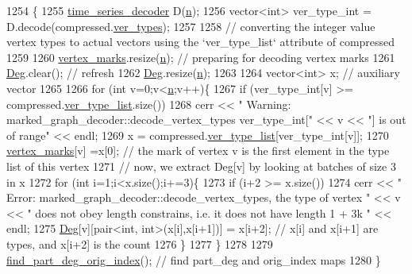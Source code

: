 \begin{DoxyCode}
1254 \{
1255   \hyperlink{classtime__series__decoder}{time\_series\_decoder} D(\hyperlink{classmarked__graph__decoder_aefc93611bc4a3e9a5d3956d97649a0e9}{n});
1256   vector<int> ver\_type\_int = D.decode(compressed.\hyperlink{classmarked__graph__compressed_af446cc5e23c241a92b76642fd5ebc403}{ver\_types});
1257 
1258   \textcolor{comment}{// converting the integer value vertex types to actual vectors using the `ver\_type\_list` attribute of
       compressed}
1259 
1260   \hyperlink{classmarked__graph__decoder_a98be932a5abff7efbc8dd4290268b69a}{vertex\_marks}.resize(\hyperlink{classmarked__graph__decoder_aefc93611bc4a3e9a5d3956d97649a0e9}{n}); \textcolor{comment}{// preparing for decoding vertex marks}
1261   \hyperlink{classmarked__graph__decoder_a5040ad86467693eab415f615408bfb9e}{Deg}.clear(); \textcolor{comment}{// refresh}
1262   \hyperlink{classmarked__graph__decoder_a5040ad86467693eab415f615408bfb9e}{Deg}.resize(\hyperlink{classmarked__graph__decoder_aefc93611bc4a3e9a5d3956d97649a0e9}{n});
1263 
1264   vector<int> x; \textcolor{comment}{// auxiliary vector}
1265 
1266   \textcolor{keywordflow}{for} (\textcolor{keywordtype}{int} v=0;v<\hyperlink{classmarked__graph__decoder_aefc93611bc4a3e9a5d3956d97649a0e9}{n};v++)\{
1267     \textcolor{keywordflow}{if} (ver\_type\_int[v] >= compressed.\hyperlink{classmarked__graph__compressed_af2e3e55223d436628a02758dfae88493}{ver\_type\_list}.size())
1268       cerr << \textcolor{stringliteral}{" Warning: marked\_graph\_decoder::decode\_vertex\_types ver\_type\_int["} << v << \textcolor{stringliteral}{"] is out of
       range"} << endl;
1269     x = compressed.\hyperlink{classmarked__graph__compressed_af2e3e55223d436628a02758dfae88493}{ver\_type\_list}[ver\_type\_int[v]];
1270     \hyperlink{classmarked__graph__decoder_a98be932a5abff7efbc8dd4290268b69a}{vertex\_marks}[v] =x[0]; \textcolor{comment}{// the mark of vertex v is the first element in the type list of
       this vertex}
1271     \textcolor{comment}{// now, we extract Deg[v] by looking at batches of size 3 in x}
1272     \textcolor{keywordflow}{for} (\textcolor{keywordtype}{int} i=1;i<x.size();i+=3)\{
1273       \textcolor{keywordflow}{if} (i+2 >= x.size())
1274         cerr << \textcolor{stringliteral}{" Error: marked\_graph\_decoder::decode\_vertex\_types, the type of vertex "} << v << \textcolor{stringliteral}{" does not
       obey length constrains, i.e. it does not have length 1 + 3k "} << endl;
1275           \hyperlink{classmarked__graph__decoder_a5040ad86467693eab415f615408bfb9e}{Deg}[v][pair<int, int>(x[i],x[i+1])] = x[i+2]; \textcolor{comment}{// x[i] and x[i+1] are types, and x[i+2] is the
       count}
1276     \}
1277   \}
1278 
1279   \hyperlink{classmarked__graph__decoder_a1e035914395d2a3a50064b758c478ffd}{find\_part\_deg\_orig\_index}(); \textcolor{comment}{// find part\_deg and orig\_index maps}
1280 \}
\end{DoxyCode}

